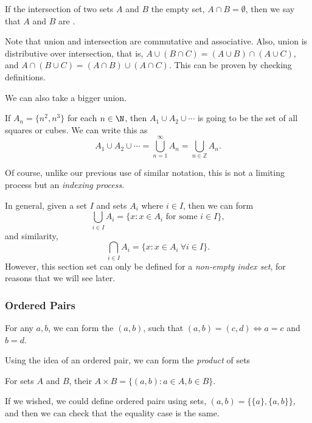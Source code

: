 \documentclass[a4paper]{scrartcl}
\begin{document}
\begin{definition}[Disjoint]
	If the intersection of two sets $A$ and $B$ the empty set, $A \cap B = \emptyset$, then we say that $A$ and $B$ are .
\end{definition}

Note that union and intersection are commutative and associative. Also, union is distributive over intersection, that is, $A \cup (B \cap C) = (A \cup B) \cap (A \cup C)$, and $A \cap (B \cup C) = (A \cap B) \cup (A \cap C)$. This can be proven by checking definitions.

We can also take a bigger union.
\begin{example}
	If $A_n = \{n^2, n^3 \}$ for each $n \in \N$, then
	$
	A_1 \cup A_2 \cup \cdots
	$
	is going to be the set of all squares or cubes. We can write this as
	$$
	A_1 \cup A_2 \cup \cdots = \bigcup_{n = 1}^{\infty} A_n = \bigcup_{n \in \mathbb{Z}} A_n.
	$$
\end{example}
Of course, unlike our previous use of similar notation, this is not a limiting process but an \emph{indexing process}. 

In general, given a set $I$ and sets $A_i$ where $i \in I$, then we can form
$$
\bigcup_{i \in I} A_i = \{x : x \in A_i \text{ for some } i \in I\},
$$
and similarity,
$$
\bigcap_{i \in I} A_i = \{x : x \in A_i\ \forall i \in I\}.
$$
However, this section set can only be defined for a \emph{non-empty index set}, for reasons that we will see later.


\subsubsection{Ordered Pairs}
\vspace{\baselineskip}
\begin{definition}
	For any $a, b$, we can form the  $(a, b)$, such that $(a, b) = (c, d) \iff a = c$ and $b = d$.
\end{definition}

Using the idea of an ordered pair, we can form the \emph{product} of sets
\begin{definition}
	For sets $A$ and $B$, their  $A \times B = \{(a ,b) : a \in A, b \in B\}$.
\end{definition}

\begin{remark}
	If we wished, we could define ordered pairs using sets, $(a, b) = \{\{a\}, \{a, b\}\}$, and then we can check that the equality case is the same.
\end{remark}
\end{document}
